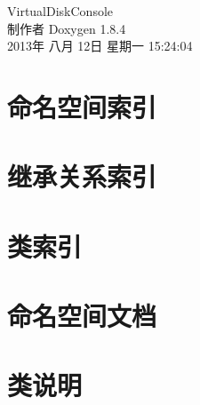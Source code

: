 \documentclass[twoside]{book}
\newcommand{\clearemptydoublepage}{%
  \newpage{\pagestyle{empty}\cleardoublepage}%
}
\begin{document}
\hypersetup{pageanchor=false}
\begin{titlepage}
\vspace*{7cm}
\begin{center}%
{\Large Virtual\-Disk\-Console }\\
\vspace*{1cm}
{\large 制作者 Doxygen 1.8.4}\\
\vspace*{0.5cm}
{\small 2013年 八月 12日 星期一 15:24:04}\\
\end{center}
\end{titlepage}
\clearemptydoublepage
\tableofcontents
\clearemptydoublepage
{}
\hypersetup{pageanchor=true}

\chapter{命名空间索引}

\chapter{继承关系索引}

\chapter{类索引}

\chapter{命名空间文档}

\chapter{类说明}





























\newpage
{}
{}
\printindex
\end{document}
